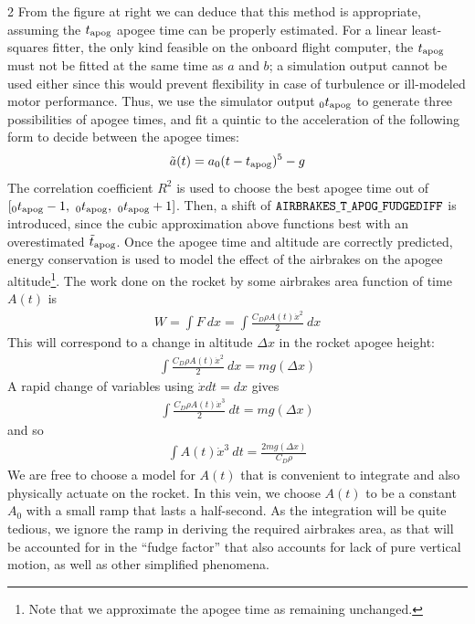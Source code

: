 \documentclass{amsdtx}
\begin{document}
\begin{multicols}{2}
From the figure at right we can deduce that this method is appropriate, assuming the $t_{\rm apog}$ apogee time can be properly estimated. For a linear least-squares fitter, the only kind feasible on the onboard flight computer, the $t_{\rm apog}$ must not be fitted at the same time as $a$ and $b$; a simulation output cannot be used either since this would prevent flexibility in case of turbulence or ill-modeled motor performance. Thus, we use the simulator output $_0t_{\rm apog}$ to generate three possibilities of apogee times, and fit a quintic to the acceleration of the following form to decide between the apogee times:
\begin{align}
	\tilde a(t) = a_0(t-t_{\rm apog})^5 - g
\end{align}
The correlation coefficient $R^2$ is used to choose the best apogee time out of $[_0t_{\rm apog}-1,~_0t_{\rm apog},~_0t_{\rm apog}+1]$. Then, a shift of $\tt AIRBRAKES\underline{~}T\underline{~}APOG\underline{~}FUDGEDIFF$ is introduced, since the cubic approximation above functions best with an overestimated $\tilde t_{\rm apog}$. Once the apogee time and altitude are correctly predicted, energy conservation is used to model the effect of the airbrakes on the apogee altitude\footnote{ Note that we approximate the apogee time as remaining unchanged.}. The work done on the rocket by some airbrakes area function of time $A(t)$ is 
\begin{align}
		W = \int F~dx = \int \frac{C_D\rho A(t)\dot x^2}{2}~dx 
\end{align}
This will correspond to a change in altitude $\Delta x$ in the rocket apogee height:
\begin{align}
	\int \frac{C_D\rho A(t)\dot x^2}{2}~dx  = mg(\Delta x)
\end{align}
A rapid change of variables using $\dot x dt = dx$ gives
\begin{align}
	\int \frac{C_D\rho A(t)\dot x^3}{2}~dt  = mg(\Delta x)
\end{align}
and so
\begin{align}
	\int A(t)\dot x^3~dt = \frac{2mg(\Delta x)}{C_D\rho}
\end{align}
We are free to choose a model for $A(t)$ that is convenient to integrate and also physically actuate on the rocket. In this vein, we choose $A(t)$ to be a constant $A_0$ with a small ramp that lasts a half-second. As the integration will be quite tedious, we ignore the ramp in deriving the required airbrakes area, as that will be accounted for in the ``fudge factor'' that also accounts for lack of pure vertical motion, as well as other simplified phenomena. 
\end{multicols}
\end{document}
